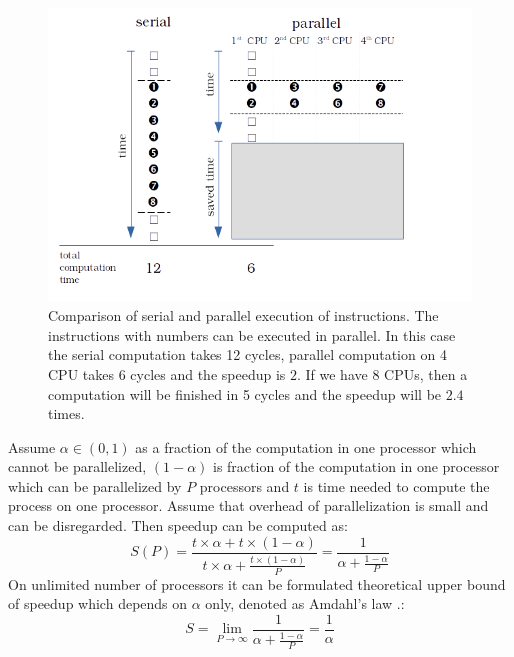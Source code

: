 \begin{figure}[ht]
    \centering
    \includegraphics[width=1\textwidth]{serialvsparallel.png}
    \caption{Comparison of serial and parallel execution of instructions. The instructions with numbers can be executed in parallel. In this case the serial computation takes 12 cycles, parallel computation on 4 CPU takes 6 cycles and the speedup is $2$. If we have 8 CPUs, then a computation will be finished in 5 cycles and the speedup will be $2.4$ times.}
    \label{fig:serialvsparallel}
\end{figure}

Assume  $\alpha \in (0,1)$ as a fraction of the computation in one processor which cannot be parallelized, $(1-\alpha)$ is fraction of the computation in one processor which can be parallelized by $P$ processors and $t$ is time needed to compute the process on one processor. Assume that overhead of parallelization is small and can be disregarded. Then speedup can be computed as:
\begin{equation}\label{eq:speedup2}
 S(P) = \frac{t\times\alpha+t\times(1-\alpha)}{t \times \alpha + \frac{t \times (1-\alpha)}{P} } = \frac{1}{\alpha +\frac{1-\alpha}{P}}
 \end{equation}
On unlimited number of processors it can be formulated theoretical upper bound of speedup which depends on $\alpha$ only, denoted as Amdahl's law \cite{Amdahl1967}.:
\begin{equation} \label{eq:amdahl}
S = \lim_{P \to \infty} \frac{1}{\alpha +\frac{1-\alpha}{P}} = \frac{1}{\alpha}
\end{equation}

